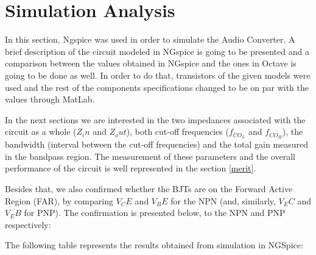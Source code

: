 \section{Simulation Analysis}
\label{sec:simulation}

In this section, Ngspice was used in order to simulate the Audio Converter. A brief description of the circuit modeled in NGspice is going to be presented and a comparison between the values obtained in NGspice and the ones in Octave is going to be done as well. In order to do that, transistors of the given models were used and the rest of the components specifications changed to be on par with the values through MatLab.

In the next sections we are interested in the two impedances associated with the circuit as a whole ($Z_in$ and $Z_out$), both cut-off frequencies ($f_{CO_L}$ and $f_{CO_H}$), the bandwidth (interval between the cut-off frequencies) and the total gain measured in the bandpass region. The measurement of these parameters and the overall performance of the circuit is well represented in the section \ref{merit}.\par 

Besides that, we also confirmed whether the BJTs are on the Forward Active Region (FAR), by comparing $V_CE$ and $V_BE$ for the NPN (and, similarly, $V_EC$ and $V_EB$ for PNP).
The confirmation is presented below, to the NPN and PNP respectively:

%

%

The following table represents the results obtained from simulation in NGSpice:

%

